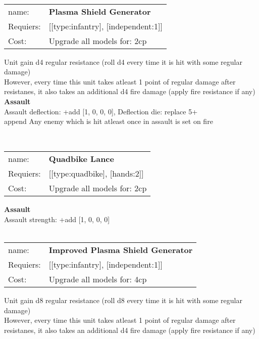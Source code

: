 \ \\
\begin{tabular}{ll}
name: & {\bf Plasma Shield Generator } \\
Requiers: & [[type:infantry], [independent:1]] \\
Cost: & Upgrade all models for: 2cp \\
\end{tabular}

Unit gain d4 regular resistance (roll d4 every time it is hit with some regular damage)\\ 
However, every time this unit takes atleast 1 point of regular damage after resistanes, it also takes an additional d4 fire damage (apply fire resistance if any)\\ 




{\bf Assault} \ \\
Assault deflection: +add [1, 0, 0, 0], Deflection die: replace 5+
\\ 

append Any enemy which is hit atleast once in assault is set on fire


\ \\
\begin{tabular}{ll}
name: & {\bf Quadbike Lance } \\
Requiers: & [[type:quadbike], [hands:2]] \\
Cost: & Upgrade all models for: 2cp \\
\end{tabular}





{\bf Assault} \ \\
Assault strength: +add [1, 0, 0, 0] 
\\ 




\ \\
\begin{tabular}{ll}
name: & {\bf Improved Plasma Shield Generator } \\
Requiers: & [[type:infantry], [independent:1]] \\
Cost: & Upgrade all models for: 4cp \\
\end{tabular}

Unit gain d8 regular resistance (roll d8 every time it is hit with some regular damage)\\ 
However, every time this unit takes atleast 1 point of regular damage after resistanes, it also takes an additional d4 fire damage (apply fire resistance if any)\\ 




